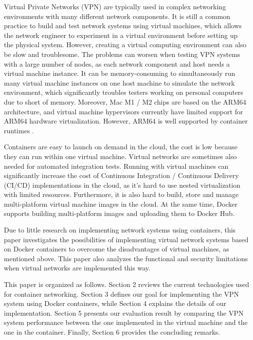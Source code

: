 \documentclass[article]{aaltoseries}
\begin{document}
Virtual Private Networks (VPN) are typically used in complex networking environments with many different network components. It is still a common practice \cite{9151942} to build and test network systems using virtual machines, which allows the network engineer to experiment in a virtual environment before setting up the physical system. However, creating a virtual computing environment can also be slow and troublesome. The problems can worsen when testing VPN systems with a large number of nodes, as each network component and host needs a virtual machine instance. It can be memory-consuming to simultaneously run many virtual machine instances on one host machine to simulate the network environment, which significantly troubles testers working on personal computers due to short of memory. Moreover, Mac M1 / M2 chips are based on the ARM64 architecture, and virtual machine hypervisors currently have limited support for ARM64 hardware virtualization. However, ARM64 is well supported by container runtimes \cite{9852232}.

Containers are easy to launch on demand in the cloud, the cost is low because they can run within one virtual machine. Virtual networks are sometimes also needed for automated integration tests. Running with virtual machines can significantly increase the cost of Continuous Integration / Continuous Delivery (CI/CD) implementations in the cloud, as it's hard to use nested virtualization with limited resources. Furthermore, it is also hard to build, store and manage multi-platform virtual machine images in the cloud. At the same time, Docker supports building multi-platform images \cite{dockermultiplatform} and uploading them to Docker Hub.

Due to little research on implementing network systems using containers, this paper investigates the possibilities of implementing virtual network systems based on Docker containers to overcome the disadvantages of virtual machines, as mentioned above. This paper also analyzes the functional and security limitations when virtual networks are implemented this way.

This paper is organized as follows. Section 2 reviews the current technologies used for container networking. Section 3 defines our goal for implementing the VPN system using Docker containers, while Section 4 explains the details of our implementation. Section 5 presents our evaluation result by comparing the VPN system performance between the one implemented in the virtual machine and the one in the container. Finally, Section 6 provides the concluding remarks.
\end{document}

